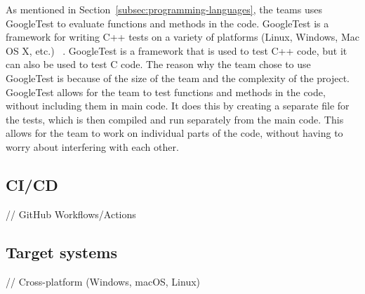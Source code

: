As mentioned in Section~\ref{subsec:programming-languages}, the teams uses GoogleTest to evaluate functions and
methods in the code.
GoogleTest is a framework for writing C++ tests on a variety of platforms (Linux, Windows, Mac OS X, etc.)
~\cite{googletest}.
GoogleTest is a framework that is used to test C++ code, but it can also be used to test C code.
The reason why the team chose to use GoogleTest is because of the size of the team and the complexity of the project.
GoogleTest allows for the team to test functions and methods in the code, without including them in main code.
It does this by creating a separate file for the tests, which is then compiled and run separately from the main code.
This allows for the team to work on individual parts of the code, without having to worry about interfering with each
other.


\subsection{CI/CD}\label{subsec:ci/cd}

// GitHub Workflows/Actions

\subsection{Target systems}\label{subsec:target-systems}

// Cross-platform (Windows, macOS, Linux)
